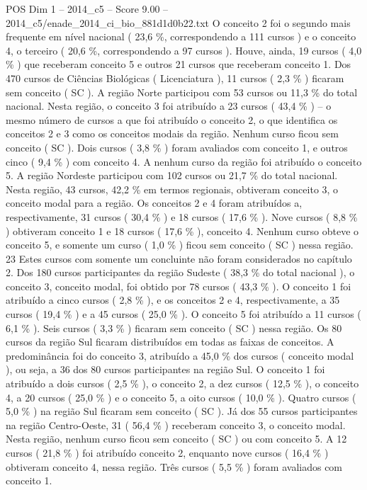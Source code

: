 \begin{textsample}{POS Dim 1 – 2014\_c5 – Score 9.00 – 2014\_c5/enade\_2014\_ci\_bio\_881d1d0b22.txt}
O conceito 2 foi o segundo mais frequente em nível nacional ( 23,6 \%, correspondendo a 111 cursos ) e o conceito 4, o terceiro ( 20,6 \%, correspondendo a 97 cursos ).
Houve, ainda, 19 cursos ( 4,0 \% ) que receberam conceito 5 e outros 21 cursos que receberam conceito 1.
Dos 470 cursos de Ciências Biológicas ( Licenciatura ), 11 cursos ( 2,3 \% ) ficaram sem conceito ( SC ).
A região Norte participou com 53 cursos ou 11,3 \% do total nacional.
Nesta região, o conceito 3 foi atribuído a 23 cursos ( 43,4 \% ) – o mesmo número de cursos a que foi atribuído o conceito 2, o que identifica os conceitos 2 e 3 como os conceitos modais da região.
Nenhum curso ficou sem conceito ( SC ).
Dois cursos ( 3,8 \% ) foram avaliados com conceito 1, e outros cinco ( 9,4 \% ) com conceito 4.
A nenhum curso da região foi atribuído o conceito 5.
A região Nordeste participou com 102 cursos ou 21,7 \% do total nacional.
Nesta região, 43 cursos, 42,2 \% em termos regionais, obtiveram conceito 3, o conceito modal para a região.
Os conceitos 2 e 4 foram atribuídos a, respectivamente, 31 cursos ( 30,4 \% ) e 18 cursos ( 17,6 \% ).
Nove cursos ( 8,8 \% ) obtiveram conceito 1 e 18 cursos ( 17,6 \% ), conceito 4.
Nenhum curso obteve o conceito 5, e somente um curso ( 1,0 \% ) ficou sem conceito ( SC ) nessa região. 23 Estes cursos com somente um concluinte não foram considerados no capítulo 2.
Dos 180 cursos participantes da região Sudeste ( 38,3 \% do total nacional ), o conceito 3, conceito modal, foi obtido por 78 cursos ( 43,3 \% ).
O conceito 1 foi atribuído a cinco cursos ( 2,8 \% ), e os conceitos 2 e 4, respectivamente, a 35 cursos ( 19,4 \% ) e a 45 cursos ( 25,0 \% ).
O conceito 5 foi atribuído a 11 cursos ( 6,1 \% ).
Seis cursos ( 3,3 \% ) ficaram sem conceito ( SC ) nessa região.
Os 80 cursos da região Sul ficaram distribuídos em todas as faixas de conceitos.
A predominância foi do conceito 3, atribuído a 45,0 \% dos cursos ( conceito modal ), ou seja, a 36 dos 80 cursos participantes na região Sul.
O conceito 1 foi atribuído a dois cursos ( 2,5 \% ), o conceito 2, a dez cursos ( 12,5 \% ), o conceito 4, a 20 cursos ( 25,0 \% ) e o conceito 5, a oito cursos ( 10,0 \% ).
Quatro cursos ( 5,0 \% ) na região Sul ficaram sem conceito ( SC ).
Já dos 55 cursos participantes na região Centro-Oeste, 31 ( 56,4 \% ) receberam conceito 3, o conceito modal.
Nesta região, nenhum curso ficou sem conceito ( SC ) ou com conceito 5.
A 12 cursos ( 21,8 \% ) foi atribuído conceito 2, enquanto nove cursos ( 16,4 \% ) obtiveram conceito 4, nessa região.
Três cursos ( 5,5 \% ) foram avaliados com conceito 1.

\end{textsample}

